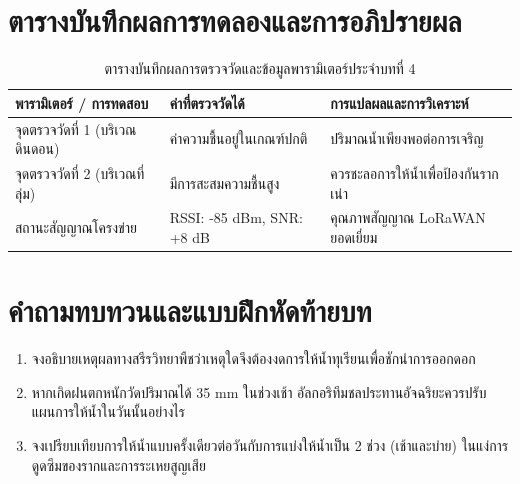 \section{ตารางบันทึกผลการทดลองและการอภิปรายผล}
\begin{table}[H]
\centering\small
\caption{ตารางบันทึกผลการตรวจวัดและข้อมูลพารามิเตอร์ประจำบทที่ 4}
\label{tab:ch04_datasheet}
\begin{tabularx}{\textwidth}{p{} p{} X}
\toprule
\textbf{พารามิเตอร์ / การทดสอบ} & \textbf{ค่าที่ตรวจวัดได้} & \textbf{การแปลผลและการวิเคราะห์} \\
\midrule
จุดตรวจวัดที่ 1 (บริเวณดินดอน) & ค่าความชื้นอยู่ในเกณฑ์ปกติ & ปริมาณน้ำเพียงพอต่อการเจริญ \\
จุดตรวจวัดที่ 2 (บริเวณที่ลุ่ม) & มีการสะสมความชื้นสูง & ควรชะลอการให้น้ำเพื่อป้องกันรากเน่า \\
สถานะสัญญาณโครงข่าย & RSSI: -85 dBm, SNR: +8 dB & คุณภาพสัญญาณ LoRaWAN ยอดเยี่ยม \\
\bottomrule
\end{tabularx}
\end{table}

\section{คำถามทบทวนและแบบฝึกหัดท้ายบท}
\begin{enumerate}
    \item จงอธิบายเหตุผลทางสรีรวิทยาพืชว่าเหตุใดจึงต้องงดการให้น้ำทุเรียนเพื่อชักนำการออกดอก
    \item หากเกิดฝนตกหนักวัดปริมาณได้ 35 mm ในช่วงเช้า อัลกอริทึมชลประทานอัจฉริยะควรปรับแผนการให้น้ำในวันนั้นอย่างไร
    \item จงเปรียบเทียบการให้น้ำแบบครั้งเดียวต่อวันกับการแบ่งให้น้ำเป็น 2 ช่วง (เช้าและบ่าย) ในแง่การดูดซึมของรากและการระเหยสูญเสีย
\end{enumerate}
